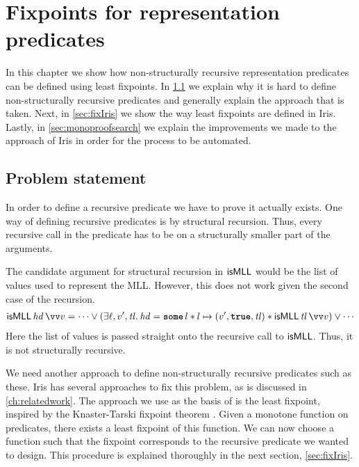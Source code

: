 \documentclass[thesis.tex]{subfiles}
\begin{document}
\chapter{Fixpoints for representation predicates} \label{ch:fixpoints}
In this chapter we show how non-structurally recursive representation predicates can be defined using least fixpoints. In \cref{sec:fixproblem} we explain why it is hard to define non-structurally recursive predicates and generally explain the approach that is taken. Next, in \cref{sec:fixIris} we show the way least fixpoints are defined in Iris. Lastly, in \cref{sec:monoproofsearch} we explain the improvements we made to the approach of Iris in order for the process to be automated.

\section{Problem statement} \label{sec:fixproblem}
In order to define a recursive predicate we have to prove it actually exists. One way of defining recursive predicates is by structural recursion. Thus, every recursive call in the predicate has to be on a structurally smaller part of the arguments.

The candidate argument for structural recursion in $\textsf{\upshape isMLL}$ would be the list of values used to represent the MLL. However, this does not work given the second case of the recursion.
\begin{align*}
  \isMLL\,\hd\,\vect{\val} = \cdots \lor (\Exists \loc, \val', \tl. \hd = \Some l * l \fmapsto (\val', \True, \tl) * \isMLL\, \tl\, \vect{\val}) \lor \cdots
\end{align*}
Here the list of values is passed straight onto the recursive call to $\textsf{\upshape isMLL}$. Thus, it is not structurally recursive.

We need another approach to define non-structurally recursive predicates such as these. Iris has several approaches to fix this problem, as is discussed in \cref{ch:relatedwork}. The approach we use as the basis of \eiind is the least fixpoint, inspired by the Knaster-Tarski fixpoint theorem \cite*{tarskiLatticetheoreticalFixpointTheorem1955}. Given a monotone function on predicates, there exists a least fixpoint of this function. We can now choose a function such that the fixpoint corresponds to the recursive predicate we wanted to design. This procedure is explained thoroughly in the next section, \cref{sec:fixIris}.
\end{document}
